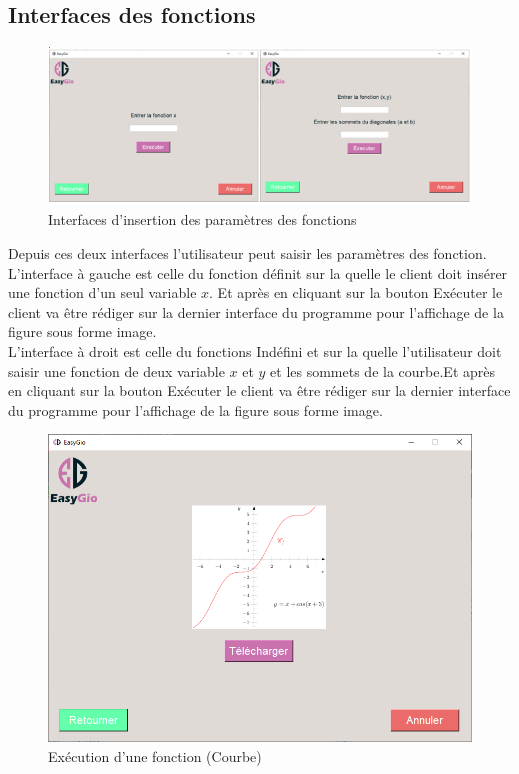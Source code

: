 \documentclass[a4paper]{report}
\begin{document}
\subsection{Interfaces des fonctions}
\begin{figure}[!h]
    \centering
    \includegraphics[width=14cm]{images/InputesInter.PNG}
    \caption{Interfaces d'insertion des paramètres des fonctions}
    \label{fig:Interfaces d'insertion des paramètres des fonctions}
\end{figure}
Depuis ces deux interfaces l'utilisateur peut saisir les paramètres des fonction.\\
L'interface à gauche est celle du fonction définit sur la quelle le client doit insérer une fonction d'un seul variable $x$. Et après en cliquant sur la bouton Exécuter le client va être rédiger sur la dernier interface du programme pour l'affichage de la figure sous forme image.\\
L'interface à droit est celle du fonctions Indéfini et sur la quelle l'utilisateur doit saisir une fonction de deux variable $x$ et $y$ et les sommets de la courbe.Et après en cliquant sur la bouton Exécuter le client va être rédiger sur la dernier interface du programme pour l'affichage de la figure sous forme image.\\
\begin{figure}[!h]
    \centering
    \includegraphics[width=14cm]{images/Fonction.PNG}
    \caption{Exécution d'une fonction (Courbe)}
    \label{fig:Exécution d'une fonction (Courbe)}
\end{figure}
\newpage
\end{document}
